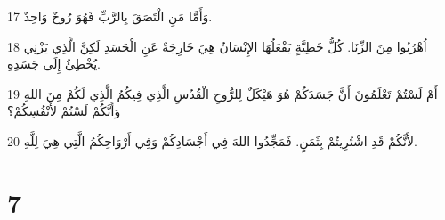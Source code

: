 \par 17 وَأَمَّا مَنِ الْتَصَقَ بِالرَّبِّ فَهُوَ رُوحٌ وَاحِدٌ.
\par 18 اُهْرُبُوا مِنَ الزِّنَا. كُلُّ خَطِيَّةٍ يَفْعَلُهَا الإِنْسَانُ هِيَ خَارِجَةٌ عَنِ الْجَسَدِ لَكِنَّ الَّذِي يَزْنِي يُخْطِئُ إِلَى جَسَدِهِ.
\par 19 أَمْ لَسْتُمْ تَعْلَمُونَ أَنَّ جَسَدَكُمْ هُوَ هَيْكَلٌ لِلرُّوحِ الْقُدُسِ الَّذِي فِيكُمُ الَّذِي لَكُمْ مِنَ اللهِ وَأَنَّكُمْ لَسْتُمْ لأَنْفُسِكُمْ؟
\par 20 لأَنَّكُمْ قَدِ اشْتُرِيتُمْ بِثَمَنٍ. فَمَجِّدُوا اللهَ فِي أَجْسَادِكُمْ وَفِي أَرْوَاحِكُمُ الَّتِي هِيَ لِلَّهِ.

\chapter{7}

